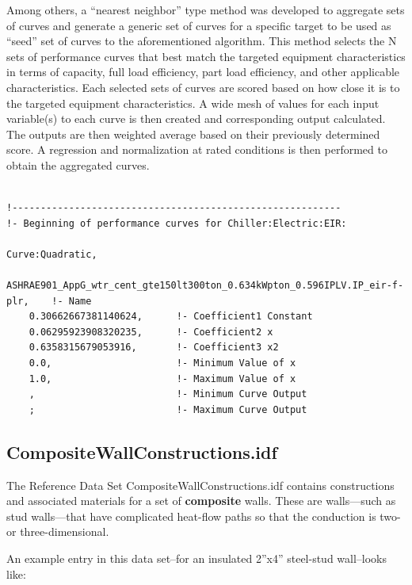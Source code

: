 Among others, a ``nearest neighbor'' type method was developed to aggregate sets of curves and generate a generic set of curves for a specific target to be used as ``seed'' set of curves to the aforementioned algorithm. This method selects the N sets of performance curves that best match the targeted equipment characteristics in terms of capacity, full load efficiency, part load efficiency, and other applicable characteristics. Each selected sets of curves are scored based on how close it is to the targeted equipment characteristics. A wide mesh of values for each input variable(s) to each curve is then created and corresponding output calculated. The outputs are then weighted average based on their previously determined score. A regression and normalization at rated conditions is then performed to obtain the aggregated curves.

\begin{lstlisting}

!----------------------------------------------------------
!- Beginning of performance curves for Chiller:Electric:EIR:

Curve:Quadratic,
    ASHRAE901_AppG_wtr_cent_gte150lt300ton_0.634kWpton_0.596IPLV.IP_eir-f-plr,    !- Name
    0.30662667381140624,      !- Coefficient1 Constant
    0.06295923908320235,      !- Coefficient2 x
    0.6358315679053916,       !- Coefficient3 x2
    0.0,                      !- Minimum Value of x
    1.0,                      !- Maximum Value of x
    ,                         !- Minimum Curve Output
    ;                         !- Maximum Curve Output

\end{lstlisting}

\subsection{CompositeWallConstructions.idf}\label{compositewallconstructions.idf}

The Reference Data Set CompositeWallConstructions.idf contains constructions and associated materials for a set of \textbf{composite} walls. These are walls---such as stud walls---that have complicated heat-flow paths so that the conduction is two- or three-dimensional.

An example entry in this data set--for an insulated 2''x4'' steel-stud wall--looks like:

